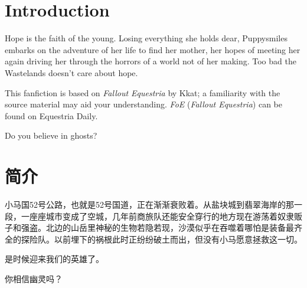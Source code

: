 \chapter{Introduction}

Hope is the faith of the young. Losing everything she holds dear, Puppysmiles embarks on the adventure of her life to find her mother, her hopes of meeting her again driving her through the horrors of a world not of her making. Too bad the Wastelands doesn't care about hope.

This fanfiction is based on \emph{Fallout Equestria} by Kkat; a familiarity with the source material may aid your understanding. \emph{FoE} (\emph{Fallout Equestria}) can be found on Equestria Daily.

\clearpage

\begin{motto}
Do you believe in ghosts?
\end{motto}


\chapter{简介}

小马国52号公路，也就是52号国道，正在渐渐衰败着。从盐块城到翡翠海岸的那一段，一座座城市变成了空城，几年前商旅队还能安全穿行的地方现在游荡着奴隶贩子和强盗。北边的山岳里神秘的生物若隐若现，沙漠似乎在吞噬着哪怕是装备最齐全的探险队。以前埋下的祸根此时正纷纷破土而出，但没有小马愿意拯救这一切。

是时候迎来我们的英雄了。

\clearpage

\begin{motto}
你相信幽灵吗？
\end{motto}


